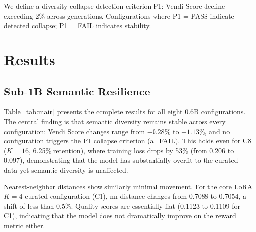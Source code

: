 \documentclass[11pt,a4paper]{article}
\begin{document}
We define a diversity collapse detection criterion P1: Vendi Score decline exceeding 2\% across generations. Configurations where P1 = PASS indicate detected collapse; P1 = FAIL indicates stability.

\section{Results}

\subsection{Sub-1B Semantic Resilience}
\label{sec:sub1b}

Table~\ref{tab:main} presents the complete results for all eight 0.6B configurations. The central finding is that semantic diversity remains stable across every configuration: Vendi Score changes range from $-0.28\%$ to $+1.13\%$, and no configuration triggers the P1 collapse criterion (all FAIL). This holds even for C8 ($K{=}16$, 6.25\% retention), where training loss drops by 53\% (from 0.206 to 0.097), demonstrating that the model has substantially overfit to the curated data yet semantic diversity is unaffected.

Nearest-neighbor distances show similarly minimal movement. For the core LoRA $K{=}4$ curated configuration (C1), nn-distance changes from 0.7088 to 0.7054, a shift of less than 0.5\%. Quality scores are essentially flat (0.1123 to 0.1109 for C1), indicating that the model does not dramatically improve on the reward metric either.
\end{document}
